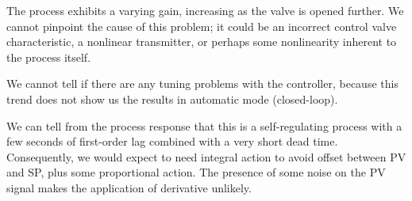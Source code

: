 \vskip 10pt

The process exhibits a varying gain, increasing as the valve is opened further.  We cannot pinpoint the cause of this problem; it could be an incorrect control valve characteristic, a nonlinear transmitter, or perhaps some nonlinearity inherent to the process itself.

\vskip 10pt

We cannot tell if there are any tuning problems with the controller, because this trend does not show us the results in automatic mode (closed-loop).

\vskip 10pt

We can tell from the process response that this is a self-regulating process with a few seconds of first-order lag combined with a very short dead time.  Consequently, we would expect to need integral action to avoid offset between PV and SP, plus some proportional action.  The presence of some noise on the PV signal makes the application of derivative unlikely.











